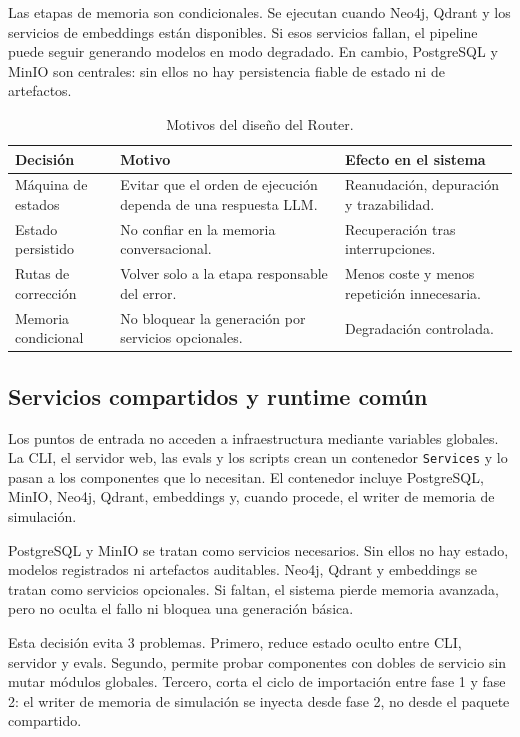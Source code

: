 Las etapas de memoria son condicionales. Se ejecutan cuando Neo4j, Qdrant y los
servicios de embeddings están disponibles. Si esos servicios fallan, el
pipeline puede seguir generando modelos en modo degradado. En cambio,
PostgreSQL y MinIO son centrales: sin ellos no hay persistencia fiable de
estado ni de artefactos.

\begin{table}[H]
\begin{center}
\small
\begin{tabular}{|p{3.1cm}|p{4.8cm}|p{4.6cm}|} \hline
\textbf{Decisión} & \textbf{Motivo} & \textbf{Efecto en el sistema} \\ \hline
Máquina de estados & Evitar que el orden de ejecución dependa de una respuesta LLM. & Reanudación, depuración y trazabilidad. \\ \hline
Estado persistido & No confiar en la memoria conversacional. & Recuperación tras interrupciones. \\ \hline
Rutas de corrección & Volver solo a la etapa responsable del error. & Menos coste y menos repetición innecesaria. \\ \hline
Memoria condicional & No bloquear la generación por servicios opcionales. & Degradación controlada. \\ \hline
\end{tabular}
\caption{Motivos del diseño del Router.}
\end{center}
\end{table}

\subsection{Servicios compartidos y runtime común}
\label{ap:servicios-runtime}

Los puntos de entrada no acceden a infraestructura mediante variables globales.
La CLI, el servidor web, las evals y los scripts crean un contenedor
\texttt{Services} y lo pasan a los componentes que lo necesitan. El contenedor
incluye PostgreSQL, MinIO, Neo4j, Qdrant, embeddings y, cuando procede, el
writer de memoria de simulación.

PostgreSQL y MinIO se tratan como servicios necesarios. Sin ellos no hay
estado, modelos registrados ni artefactos auditables. Neo4j, Qdrant y
embeddings se tratan como servicios opcionales. Si faltan, el sistema pierde
memoria avanzada, pero no oculta el fallo ni bloquea una generación básica.

Esta decisión evita 3 problemas. Primero, reduce estado oculto entre CLI,
servidor y evals. Segundo, permite probar componentes con dobles de servicio
sin mutar módulos globales. Tercero, corta el ciclo de importación entre fase 1
y fase 2: el writer de memoria de simulación se inyecta desde fase 2, no desde
el paquete compartido.

